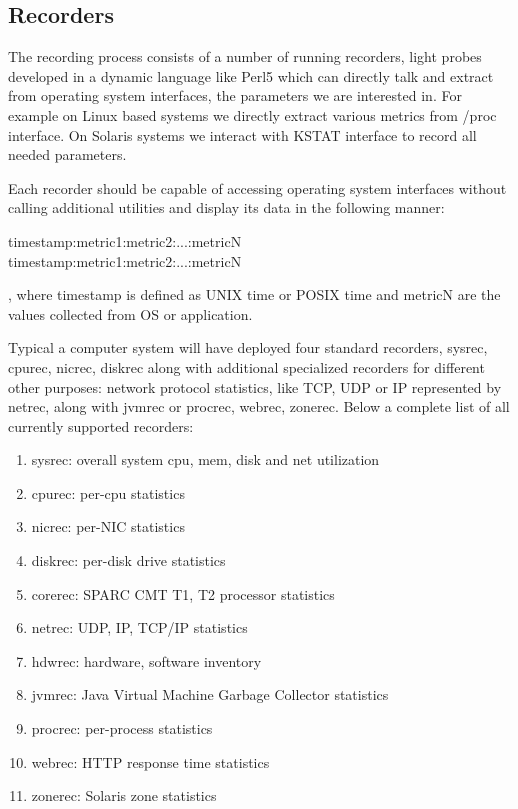 \subsection*{Recorders}
The recording process consists of a number of running recorders, 
light probes developed in a dynamic language like Perl5 which can directly
talk and extract from operating system interfaces, the parameters we are
interested in. For example on Linux based systems we directly extract
various metrics from /proc interface. On Solaris systems we interact with
KSTAT interface to record all needed parameters.

Each recorder should be capable of accessing operating system
interfaces without calling additional utilities and display its data in
the following manner:

\begin{center}
\small{
timestamp:metric1:metric2:...:metricN \\
timestamp:metric1:metric2:...:metricN}
\end{center}

, where timestamp is defined as UNIX time or POSIX time and metricN
are the values collected from OS or application.

Typical a computer system will have deployed four standard recorders,
sysrec, cpurec, nicrec, diskrec along with additional specialized
recorders for different other purposes: network protocol statistics,
like TCP, UDP or IP represented by netrec, along with jvmrec or
procrec, webrec, zonerec. Below a complete list of all currently
supported recorders:

\begin{enumerate}
\item sysrec: overall system cpu, mem, disk and net utilization
\item cpurec: per-cpu statistics
\item nicrec: per-NIC statistics
\item diskrec: per-disk drive statistics
\item corerec: SPARC CMT T1, T2 processor statistics
\item netrec: UDP, IP, TCP/IP statistics
\item hdwrec: hardware, software inventory
\item jvmrec: Java Virtual Machine Garbage Collector statistics
\item procrec: per-process statistics
\item webrec: HTTP response time statistics
\item zonerec: Solaris zone statistics
\end{enumerate}

